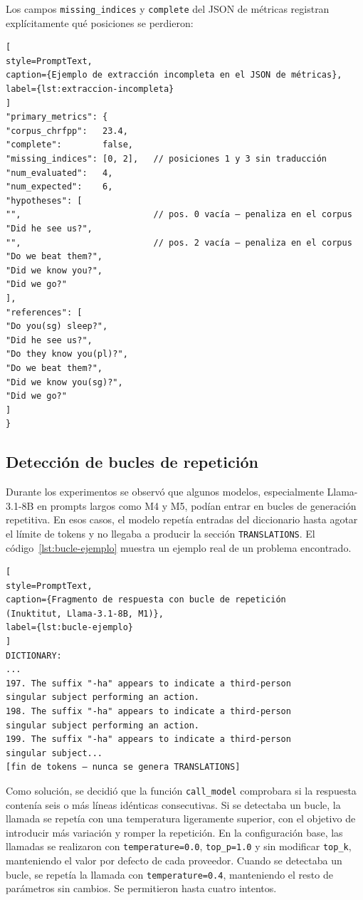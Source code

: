 Los campos \texttt{missing\_indices} y \texttt{complete} del JSON de métricas registran explícitamente qué posiciones se perdieron:

\begin{lstlisting}[
style=PromptText,
caption={Ejemplo de extracción incompleta en el JSON de métricas},
label={lst:extraccion-incompleta}
]
"primary_metrics": {
"corpus_chrfpp":   23.4,
"complete":        false,
"missing_indices": [0, 2],   // posiciones 1 y 3 sin traducción
"num_evaluated":   4,
"num_expected":    6,
"hypotheses": [
"",                          // pos. 0 vacía — penaliza en el corpus
"Did he see us?",
"",                          // pos. 2 vacía — penaliza en el corpus
"Do we beat them?",
"Did we know you?",
"Did we go?"
],
"references": [
"Do you(sg) sleep?",
"Did he see us?",
"Do they know you(pl)?",
"Do we beat them?",
"Did we know you(sg)?",
"Did we go?"
]
}
\end{lstlisting}

\subsection{Detección de bucles de repetición}
\label{subsec:bucles-repeticion}

Durante los experimentos se observó que algunos modelos, especialmente Llama-3.1-8B en prompts largos como M4 y M5, podían entrar en bucles de generación repetitiva. En esos casos, el modelo repetía entradas del diccionario hasta agotar el límite de tokens y no llegaba a producir la sección \texttt{TRANSLATIONS}. El código~\ref{lst:bucle-ejemplo} muestra un ejemplo real de un problema encontrado.

\begin{lstlisting}[
style=PromptText,
caption={Fragmento de respuesta con bucle de repetición
(Inuktitut, Llama-3.1-8B, M1)},
label={lst:bucle-ejemplo}
]
DICTIONARY:
...
197. The suffix "-ha" appears to indicate a third-person
singular subject performing an action.
198. The suffix "-ha" appears to indicate a third-person
singular subject performing an action.
199. The suffix "-ha" appears to indicate a third-person
singular subject...
[fin de tokens — nunca se genera TRANSLATIONS]
\end{lstlisting}

Como solución, se decidió que la función \texttt{call\_model} comprobara si la respuesta contenía seis o más líneas idénticas consecutivas. Si se detectaba un bucle, la llamada se repetía con una temperatura ligeramente superior, con el objetivo de introducir más variación y romper la repetición. En la configuración base, las llamadas se realizaron con \texttt{temperature=0.0}, \texttt{top\_p=1.0} y sin modificar \texttt{top\_k}, manteniendo el valor por defecto de cada proveedor. Cuando se detectaba un bucle, se repetía la llamada con \texttt{temperature=0.4}, manteniendo el resto de parámetros sin cambios. Se permitieron hasta cuatro intentos.


